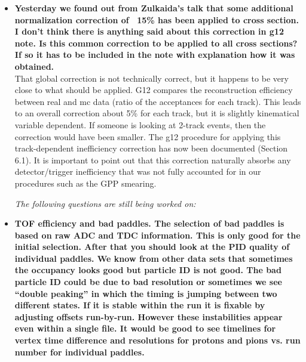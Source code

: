 \documentclass[ 12 pt]{article}
\begin{document}
\begin{itemize}
\item \textbf{Yesterday we found out from Zulkaida's talk that some additional normalization correction of ~15\% has been applied to cross section. I don't think there is anything said about this correction in g12 note. Is this common correction to be applied to all cross sections? If so it has to be included in the note with explanation how it was obtained.}\\

That global correction is not technically correct, but it happens to be very close to what should be applied. G12 compares the reconstruction efficiency between real and mc data (ratio of the acceptances for each track). This leads to an overall correction about 5\% for each track, but it is slightly kinematical variable dependent. If someone is looking at 2-track events, then the correction would have been smaller. The g12 procedure for applying this track-dependent inefficiency correction has now been documented  (Section 6.1). It is important to point out that this correction naturally absorbs any detector/trigger inefficiency that was not fully accounted for in our procedures such as the GPP smearing.



{\it The following questions are still being worked on:}


\item \textbf{TOF efficiency and bad paddles. The selection of bad paddles is based on raw
ADC and TDC information. This is only good for the initial selection. After
that you should look at the PID quality of individual paddles. We know from
other data sets that sometimes the occupancy looks good but particle ID is
not good. The bad particle ID could be due to bad resolution or sometimes we
see “double peaking” in which the timing is jumping between two different
states. If it is stable within the run it is fixable by adjusting offsets run-by-run.
However these instabilities appear even within a single file. It would be good
to see timelines for vertex time difference and resolutions for protons and
pions vs. run number for individual paddles.}\\


\end{itemize}
\end{document}
